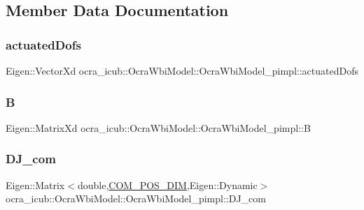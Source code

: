 \subsection{Member Data Documentation}
\hypertarget{structOcraWbiModel_1_1OcraWbiModel__pimpl_aca1e7991e3aa3941dfb08b58b4f8e82c}{}\label{structOcraWbiModel_1_1OcraWbiModel__pimpl_aca1e7991e3aa3941dfb08b58b4f8e82c} 
\subsubsection{\texorpdfstring{actuated\+Dofs}{actuatedDofs}}
{\footnotesize\ttfamily Eigen\+::\+Vector\+Xd ocra\+\_\+icub\+::\+Ocra\+Wbi\+Model\+::\+Ocra\+Wbi\+Model\+\_\+pimpl\+::actuated\+Dofs}

\hypertarget{structOcraWbiModel_1_1OcraWbiModel__pimpl_a71a78aa74a5b1422df339991ea6c6974}{}\label{structOcraWbiModel_1_1OcraWbiModel__pimpl_a71a78aa74a5b1422df339991ea6c6974} 
\subsubsection{\texorpdfstring{B}{B}}
{\footnotesize\ttfamily Eigen\+::\+Matrix\+Xd ocra\+\_\+icub\+::\+Ocra\+Wbi\+Model\+::\+Ocra\+Wbi\+Model\+\_\+pimpl\+::B}

\hypertarget{structOcraWbiModel_1_1OcraWbiModel__pimpl_a38a8628ca93524e08beada55f455249b}{}\label{structOcraWbiModel_1_1OcraWbiModel__pimpl_a38a8628ca93524e08beada55f455249b} 
\subsubsection{\texorpdfstring{D\+J\+\_\+com}{DJ\_com}}
{\footnotesize\ttfamily Eigen\+::\+Matrix$<$double,\hyperlink{OcraWbiModel_8cpp_a72cb22de2538ae949cc73fa3d7c33bdc}{C\+O\+M\+\_\+\+P\+O\+S\+\_\+\+D\+IM},Eigen\+::\+Dynamic$>$ ocra\+\_\+icub\+::\+Ocra\+Wbi\+Model\+::\+Ocra\+Wbi\+Model\+\_\+pimpl\+::\+D\+J\+\_\+com}

